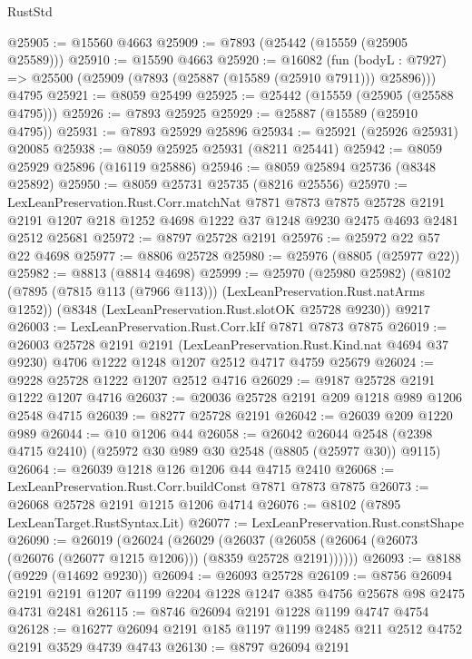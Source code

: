 \begin{lexlean}{RustStd}
\begin{coremodule}
@25905 := @15560 @4663
@25909 := @7893 (@25442 (@15559 (@25905 @25589)))
@25910 := @15590 @4663
@25920 := @16082
    (fun (bodyL : @7927) => @25500 (@25909 (@7893 (@25887 (@15589 (@25910 @7911))) @25896)))
    @4795
@25921 := @8059 @25499
@25925 := @25442 (@15559 (@25905 (@25588 @4795)))
@25926 := @7893 @25925
@25929 := @25887 (@15589 (@25910 @4795))
@25931 := @7893 @25929 @25896
@25934 := @25921 (@25926 @25931) @20085
@25938 := @8059 @25925 @25931 (@8211 @25441)
@25942 := @8059 @25929 @25896 (@16119 @25886)
@25946 := @8059 @25894 @25736 (@8348 @25892)
@25950 := @8059 @25731 @25735 (@8216 @25556)
@25970 := LexLeanPreservation.Rust.Corr.matchNat
    @7871
    @7873
    @7875
    @25728
    @2191
    @2191
    @1207
    @218
    @1252
    @4698
    @1222
    @37
    @1248
    @9230
    @2475
    @4693
    @2481
    @2512
    @25681
@25972 := @8797 @25728 @2191
@25976 := @25972 @22 @57 @22 @4698
@25977 := @8806 @25728
@25980 := @25976 (@8805 (@25977 @22))
@25982 := @8813 (@8814 @4698)
@25999 := @25970
    (@25980 @25982)
    (@8102 (@7895 (@7815 @113 (@7966 @113))) (LexLeanPreservation.Rust.natArms @1252))
    (@8348 (LexLeanPreservation.Rust.slotOK @25728 @9230))
    @9217
@26003 := LexLeanPreservation.Rust.Corr.kIf @7871 @7873 @7875
@26019 := @26003
    @25728
    @2191
    @2191
    (LexLeanPreservation.Rust.Kind.nat @4694 @37 @9230)
    @4706
    @1222
    @1248
    @1207
    @2512
    @4717
    @4759
    @25679
@26024 := @9228 @25728 @1222 @1207 @2512 @4716
@26029 := @9187 @25728 @2191 @1222 @1207 @4716
@26037 := @20036 @25728 @2191 @209 @1218 @989 @1206 @2548 @4715
@26039 := @8277 @25728 @2191
@26042 := @26039 @209 @1220 @989
@26044 := @10 @1206 @44
@26058 := @26042
    @26044
    @2548
    (@2398 @4715 @2410)
    (@25972 @30 @989 @30 @2548 (@8805 (@25977 @30)) @9115)
@26064 := @26039 @1218 @126 @1206 @44 @4715 @2410
@26068 := LexLeanPreservation.Rust.Corr.buildConst @7871 @7873 @7875
@26073 := @26068 @25728 @2191 @1215 @1206 @4714
@26076 := @8102 (@7895 LexLeanTarget.RustSyntax.Lit)
@26077 := LexLeanPreservation.Rust.constShape
@26090 := @26019
    (@26024
      (@26029
        (@26037 (@26058 (@26064 (@26073 (@26076 (@26077 @1215 @1206))) (@8359 @25728 @2191))))))
@26093 := @8188 (@9229 (@14692 @9230))
@26094 := @26093 @25728
@26109 := @8756
    @26094
    @2191
    @2191
    @1207
    @1199
    @2204
    @1228
    @1247
    @385
    @4756
    @25678
    @98
    @2475
    @4731
    @2481
@26115 := @8746 @26094 @2191 @1228 @1199 @4747 @4754
@26128 := @16277 @26094 @2191 @185 @1197 @1199 @2485 @211 @2512 @4752 @2191 @3529 @4739 @4743
@26130 := @8797 @26094 @2191

\end{coremodule}
\end{lexlean}

